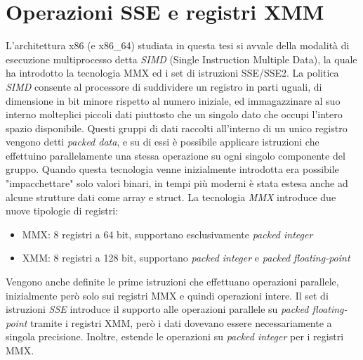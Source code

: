 \documentclass[Lau, oneside]{sapthesis}%
\begin{document}
\newpage
\section{Operazioni SSE e registri XMM}
L'architettura x86 (e x86\_64) studiata in questa tesi si avvale della modalità di esecuzione multiprocesso detta \textit{SIMD} (Single Instruction Multiple Data), la quale ha introdotto la tecnologia MMX ed i set di istruzioni SSE/SSE2.
\newline \newline
La politica \textit{SIMD} consente al processore di suddividere un registro in parti uguali, di dimensione in bit minore rispetto al numero iniziale, ed immagazzinare al suo interno molteplici piccoli dati piuttosto che un singolo dato che occupi l'intero spazio disponibile.
\newline
Questi gruppi di dati raccolti all'interno di un unico registro vengono detti \textit{packed data}, e su di essi è possibile applicare istruzioni che effettuino parallelamente una stessa operazione su ogni singolo componente del gruppo.
\newline \newline
Quando questa tecnologia venne inizialmente introdotta era possibile "impacchettare" solo valori binari, in tempi più moderni è stata estesa anche ad alcune strutture dati come array e struct.
\newline \newline
La tecnologia \textit{MMX} introduce due nuove tipologie di registri:
\begin{itemize}
    \item MMX: 8 registri a 64 bit, supportano esclusivamente \textit{packed integer}
    \item XMM: 8 registri a 128 bit, supportano \textit{packed integer} e \textit{packed floating-point}
\end{itemize}
Vengono anche definite le prime istruzioni che effettuano operazioni parallele, inizialmente però solo sui registri MMX e quindi operazioni intere.
\newline \newline
Il set di istruzioni \textit{SSE} introduce il supporto alle operazioni parallele su \textit{packed floating-point} tramite i registri XMM, però i dati dovevano essere necessariamente a singola precisione.
\newline
Inoltre, estende le operazioni su \textit{packed integer} per i registri MMX.
\newline \newline
\end{document}
